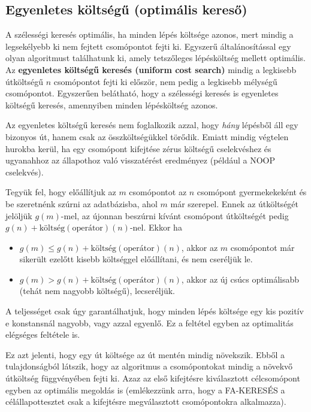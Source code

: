 \subsection{Egyenletes költségű (optimális kereső)}

A szélességi keresés optimális, ha minden lépés költsége azonos, mert mindig a
legsekélyebb ki nem fejtett csomópontot fejti ki. Egyszerű általánosítással egy
olyan algoritmust találhatunk ki, amely tetszőleges lépésköltség mellett
optimális. Az {\bf egyenletes költségű keresés (uniform cost search)} mindig a
legkisebb útköltségű $n$ csomópontot fejti ki először, nem pedig a legkisebb
mélységű csomópontot. Egyszerűen belátható, hogy a szélességi keresés is
egyenletes költségű keresés, amennyiben minden lépésköltség azonos.

Az egyenletes költségű keresés nem foglalkozik azzal, hogy {\it hány} lépésből
áll egy bizonyos út, hanem csak az összköltségükkel törődik. Emiatt mindig
végtelen hurokba kerül, ha egy csomópont kifejtése zérus költségű cselekvéshez
és ugyanahhoz az állapothoz való visszatérést eredményez (például a NOOP
cselekvés).

Tegyük fel, hogy előállítjuk az $m$ csomópontot az $n$ csomópont gyermekekeként
és be szeretnénk szúrni az adatbázisba, ahol $m$ már szerepel. Ennek az
útköltségét jelöljük $g(m)$-mel, az újonnan beszúrni kívánt csomópont
útköltségét pedig $g(n)+\text{költség}(\text{operátor})(n)$-nel. Ekkor ha
\begin{itemize}
    \item $g(m) \le g(n)+\text{költség}(\text{operátor})(n)$, akkor az $m$
        csomópontot már sikerült ezelőtt kisebb költséggel előállítani, és nem
        cseréljük le.
    \item $g(m) > g(n)+\text{költség}(\text{operátor})(n)$, akkor az új csúcs
        optimálisabb (tehát nem nagyobb költségű), lecseréljük.
\end{itemize}

A teljességet csak úgy garantálhatjuk, hogy minden lépés költsége
egy kis pozitív e konstansnál nagyobb, vagy azzal egyenlő. Ez a feltétel egyben
az optimalitás elégséges feltétele is.

Ez azt jelenti, hogy egy út költsége az út mentén mindig növekszik. Ebből a
tulajdonságból látszik, hogy az algoritmus a csomópontokat mindig a növekvő
útköltség függvényében fejti ki. Azaz az első kifejtésre kiválasztott
célcsomópont egyben az optimális megoldás is (emlékezzünk arra, hogy a
FA-KERESÉS a célállapottesztet csak a kifejtésre megválasztott csomópontokra
alkalmazza).

